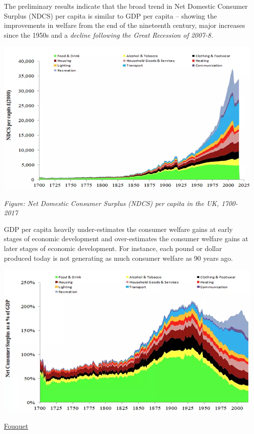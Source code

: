 \documentclass[
]{book}
\begin{document}
The preliminary results indicate that the broad trend in Net Domestic Consumer Surplus (NDCS) per capita is similar to GDP per capita -- showing the improvements in welfare from the end of the nineteenth century, major increases since the 1950s and a \emph{decline following the Great Recession of 2007-8.}

\includegraphics{fig/net_domestic_consumer_surplus_pc.png}

\emph{Figure: Net Domestic Consumer Surplus (NDCS) per capita in the UK, 1700-2017}

GDP per capita heavily under-estimates the consumer welfare gains at early stages of economic development and over-estimates the consumer welfare gains at later stages of economic development. For instance, each pound or dollar produced today is not generating as much consumer welfare as 90 years ago.

\includegraphics{fig/net_domestic_consumer_surplus_vs_gdp.png}

\href{https://www.lse.ac.uk/granthaminstitute/roger-fouquet-research-in-progress/}{Fouquet}
\end{document}
